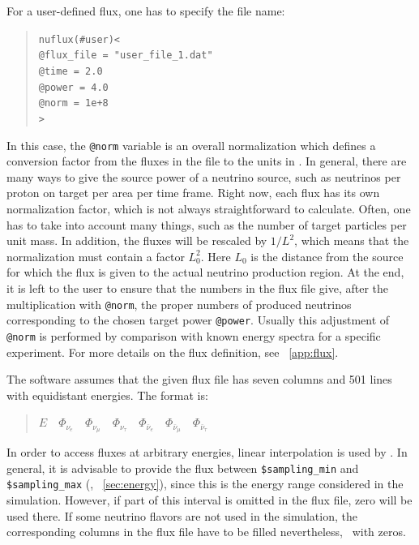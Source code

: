 %
For a user-defined flux, one has to specify the file name:
\begin{quote}
{\tt nuflux(\#user)<}\\
{\tt \tb @flux\_file = "user\_file\_1.dat"\\
\tb @time = 2.0\\
\tb @power = 4.0\\
\tb @norm = 1e+8}\\
{\tt >}
\end{quote}
In this case, the {\tt @norm} variable is an overall normalization which defines a conversion factor from the fluxes in the file to the units in \GLOBES . In general, there are many ways to give the source power of a 
neutrino source, such as neutrinos per proton on target per area per time frame. Right now, each flux has its own normalization factor, which is
not always straightforward to calculate. Often, one has to take into account
many things, such as the number of target particles per unit mass. 
In addition, the fluxes will be rescaled by $1/L^2$, which means that the
normalization must contain a factor $L_0^2$. Here $L_0$ is the distance from the source for which the flux is given to the actual neutrino production region. At the end, it is left to the user to ensure that the 
numbers in the flux file give, after the multiplication with {\tt @norm}, 
the proper numbers of produced neutrinos corresponding to the chosen target power {\tt @power}. Usually this adjustment of {\tt @norm} is performed by comparison with known energy spectra for a specific experiment.
For more details on the flux definition, see \App~\ref{app:flux}.

The software assumes that the given flux file has seven columns and
501 lines with equidistant energies. The format is:
\begin{quotation}
$ E\quad
\Phi_{\nu_e}\quad
\Phi_{\nu_\mu}\quad
\Phi_{\nu_\tau}\quad
\Phi_{\bar\nu_e}\quad
\Phi_{\bar\nu_\mu}\quad
\Phi_{\bar\nu_\tau}$
\end{quotation}
In order to access fluxes at arbitrary energies, linear interpolation 
is used by \GLOBES. In general, it is advisable to provide the flux
between {\tt \$sampling\_min} and {\tt \$sampling\_max} (\cf, \Sec~\ref{sec:energy}),
since this is the energy range considered in the simulation. However,
if part of this interval is omitted in the flux file, zero will be
used there. If some neutrino flavors are not used in the simulation,
the corresponding columns in the flux file have to be filled nevertheless,
\eg\ with zeros. 

